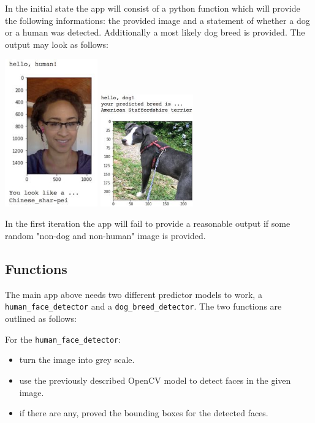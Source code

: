 \documentclass[paper=A4, DIV=10, parskip=half]{scrartcl}
\begin{document}
In the initial state the app will consist of a python function which will provide the
following informations: the provided image and a statement of whether a dog or a human
was detected. Additionally a most likely dog breed is provided.
The output may look as follows:

\begin{center}
\includegraphics[width=4cm]{images/sample_human_output.jpg}
\includegraphics[width=4cm]{images/sample_dog_output.jpg}
\end{center}

In the first iteration the app will fail to provide a reasonable output if some random
"non-dog and non-human" image is provided.

\subsection*{Functions}

The main app above needs two different predictor models to work, a
\texttt{human\_face\_detector} and a \texttt{dog\_breed\_detector}. The two functions are
outlined as follows:

For the \texttt{human\_face\_detector}:

\begin{itemize}
  \item turn the image into grey scale.
  \item use the previously described OpenCV model to detect faces in the given image.
  \item if there are any, proved the bounding boxes for the detected faces.
\end{itemize}
\end{document}
